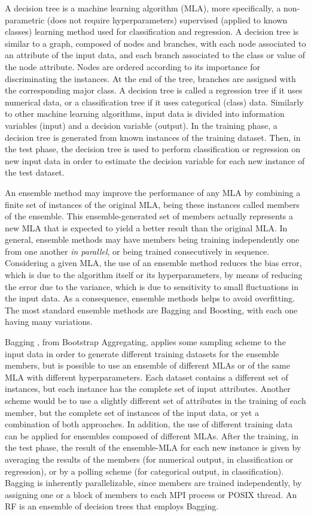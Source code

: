 A decision tree is a machine learning algorithm (MLA), more specifically, a non-parametric (does not require hyperparameters) supervised (applied to known classes) learning method used for classification and regression. A decision tree is similar to a graph, composed of nodes and branches, with each node associated to an attribute of the input data, and each branch associated to the class or value of the node attribute. Nodes are ordered according to its importance for discriminating the instances. At the end of the tree, branches are assigned with the corresponding major class. A decision tree is called a regression tree if it uses numerical data, or a classification tree if it uses categorical (class) data. Similarly to other machine learning algorithms, input data is divided into information variables (input) and a decision variable (output). In the training phase, a decision tree is generated from known instances of the training dataset. Then, in the test phase, the decision tree is used to perform classification or regression on new input data in order to estimate the decision variable for each new instance of the test dataset. 

An ensemble method may improve the performance of any MLA by combining a finite set of instances of the original MLA, being these instances called members of the ensemble. This ensemble-generated set of members actually represents a new MLA that is expected to yield a better result than the original MLA. In general, ensemble methods may have  members being training independently one from one another \textit {in parallel}, or being trained consecutively in sequence. Considering a given MLA, the use of an ensemble method reduces the bias error, which is due to the algorithm itself or its hyperparameters, by means of reducing the error due to the variance, which is due to sensitivity to small fluctuations in the input data. As a consequence, ensemble methods helps to avoid overfitting. The most standard ensemble methods are Bagging and Boosting, with each one having many variations.

Bagging \cite {Breiman2001}, from Bootstrap Aggregating, applies some sampling scheme to the input data in order to generate different training datasets for the ensemble members, but is possible to use an ensemble of different MLAs or of the same MLA with different hyperparameters. Each dataset contains a different set of instances, but each instance has the  complete set of input attributes. Another scheme would be to use a slightly different set of attributes in the training of each member, but the complete set of instances of the input data, or yet a combination of both approaches. In addition, the use of different training data can be applied for ensembles composed of different MLAs. After the training, in the test phase, the result of the ensemble-MLA for each new instance is given by averaging the results of the members (for numerical output, in classification or regression), or by a polling scheme (for categorical output, in classification). Bagging is inherently parallelizable, since members are trained independently, by assigning one or a block of members to each MPI process or POSIX thread. An RF is an ensemble of decision trees that employs Bagging.

